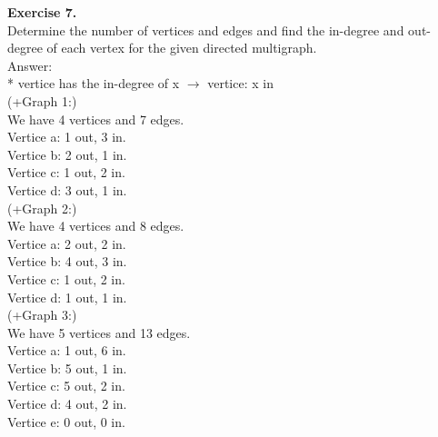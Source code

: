 \documentclass[10pt]{article}
\renewcommand{\implies}{\rightarrow}
\begin{document}
	\textbf{Exercise 7.}\\
Determine the number of vertices and edges and find the in-degree and out-degree of each vertex for the given directed multigraph.\\
Answer:\\ 
* vertice has the in-degree of x $\implies$ vertice: x in\\
\large(+Graph 1:)\\
We have 4 vertices and 7 edges.\\
Vertice a: 1 out, 3 in.\\
Vertice b: 2 out, 1 in.\\
Vertice c: 1 out, 2 in.\\
Vertice d: 3 out, 1 in.\\
\large(+Graph 2:)\\
We have 4 vertices and 8 edges.\\
Vertice a: 2 out, 2 in.\\
Vertice b: 4 out, 3 in.\\
Vertice c: 1 out, 2 in.\\
Vertice d: 1 out, 1 in.\\
\large(+Graph 3:)\\
We have 5 vertices and 13 edges.\\
Vertice a: 1 out, 6 in.\\
Vertice b: 5 out, 1 in.\\
Vertice c: 5 out, 2 in.\\
Vertice d: 4 out, 2 in.\\
Vertice e: 0 out, 0 in.\\
\end{document}

